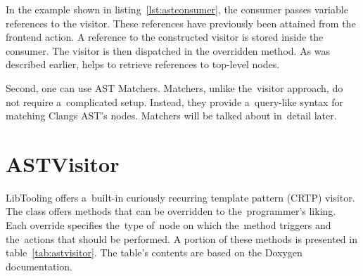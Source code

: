 In the example shown in listing~\ref{lst:astconsumer}, the consumer passes 
variable references to the visitor. 
These references have previously been attained from the frontend action. 
A reference to the constructed visitor is stored inside the consumer. 
The visitor is then dispatched in the overridden 
 method. 
As was described earlier,  helps to retrieve references 
to top-level nodes.

Second, one can use AST Matchers. 
Matchers, unlike the~visitor approach, do not require a~complicated setup. 
Instead, they provide a~query-like syntax for matching Clangs AST's nodes. 
Matchers will be talked about in~detail later.

\section{ASTVisitor}

LibTooling offers a~built-in curiously recurring template pattern 
(CRTP) visitor. 
The class  \citep{visitor:online} 
offers  methods that 
can be overridden to the~programmer's liking. 
Each override specifies the~type of~node on which the~method 
triggers and the~actions that should be performed.
A portion of these methods is presented in table~\ref{tab:astvisitor}. 
The table's contents are based on the Doxygen documentation.

